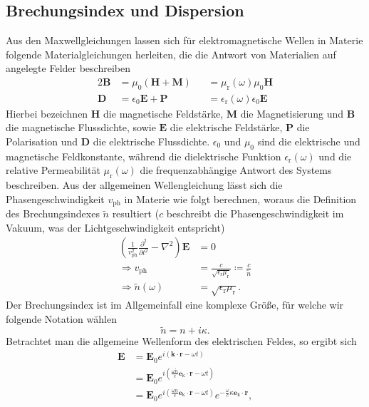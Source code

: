 \subsection{\label{subsec:FZV1}Brechungsindex und Dispersion}
Aus den Maxwellgleichungen lassen sich für elektromagnetische Wellen in Materie folgende 
Materialgleichungen herleiten, die die Antwort von Materialien auf angelegte Felder beschreiben
\begin{alignat}{2}
    \mathbf{B} &= \mu_{0}\left(\mathbf{H} + \mathbf{M}\right)&&= \mu_{\text{r}}(\omega)\mu_{0}\mathbf{H} \\
    \mathbf{D} &= \epsilon_{0}\mathbf{E} + \mathbf{P} &&= \epsilon_{\text{r}}(\omega)\epsilon_{0}\mathbf{E} \label{eq:lorenz}
\end{alignat}
Hierbei bezeichnen $\mathbf{H}$ die magnetische Feldstärke,
$\mathbf{M}$ die Magnetisierung und 
$\mathbf{B}$ die magnetische Flussdichte, 
sowie $\mathbf{E}$ die elektrische Feldstärke, 
$\mathbf{P}$ die Polarisation 
und $\mathbf{D}$ die elektrische Flussdichte.
$\epsilon_{0}$ und $\mu_{0}$ sind die elektrische und magnetische Feldkonstante, während 
die dielektrische Funktion $\epsilon_{\text{r}}(\omega)$ und die relative Permeabilität $\mu_{\text{r}}(\omega)$
die frequenzabhängige Antwort des Systems beschreiben. 
Aus der allgemeinen Wellengleichung lässt sich die Phasengeschwindigkeit $v_{\text{ph}}$ in Materie 
wie folgt berechnen, woraus die Definition des Brechungsindexes $\tilde{n}$ resultiert 
($c$ beschreibt die Phasengeschwindigkeit im Vakuum, was der Lichtgeschwindigkeit entspricht)
\begin{align}
    \left(\frac{1}{v_{\text{ph}}^{2}}\frac{\partial^{2}}{\partial t^{2}} - \nabla^{2}\right)\mathbf{E} &= 0 \\
    \Rightarrow v_{\text{ph}} &= \frac{c}{\sqrt{\epsilon_{\text{r}}\mu_{\text{r}}}} \coloneqq \frac{c}{\tilde{n}} \\
    \Rightarrow \tilde{n}(\omega) &= \sqrt{\epsilon_{\text{r}}\mu_{\text{r}}}.
\end{align}
Der Brechungsindex ist im Allgemeinfall eine komplexe Größe, für welche wir folgende Notation wählen
\begin{equation}
    \tilde{n} = n + i\kappa.
\end{equation}
Betrachtet man die allgemeine Wellenform des elektrischen Feldes, so ergibt sich 
\begin{align}
    \mathbf{E} &= \mathbf{E}_{0}e^{i\left(\mathbf{k}\cdot\mathbf{r} - \omega t\right)} \\
    &= \mathbf{E}_{0}e^{i\left(\frac{\omega \tilde{n}}{c}\mathbf{e}_{\text{k}}\cdot\mathbf{r} - \omega t\right)} \\
    &= \mathbf{E}_{0}e^{i\left(\frac{\omega n}{c}\mathbf{e}_{\text{k}}\cdot\mathbf{r} - \omega t\right)}e^{-\frac{\omega}{c}\kappa\mathbf{e}_{\text{k}}\cdot\mathbf{r}}, 
\end{align}
